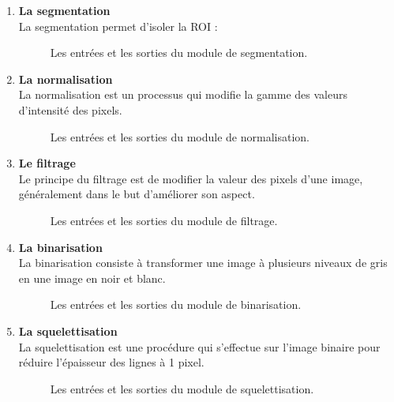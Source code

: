 \begin{enumerate}
	\item \textbf{La segmentation}\\
	La segmentation permet d'isoler la ROI :
	
	\begin{figure}[H]
		\centering
		\caption{Les entrées et les sorties du module de segmentation.}
		\label{segmentModule}
	\end{figure}
	
	
	\item \textbf{La normalisation}\\
	La normalisation est un processus qui modifie la gamme des valeurs d’intensité des pixels.
	
	\begin{figure}[H]
		\centering
		
		\caption{Les entrées et les sorties du module de normalisation.}
		\label{normModule}
	\end{figure}
	
	
	\item\textbf{Le filtrage}\\
	Le principe du filtrage est de modifier la valeur des pixels d'une image, généralement dans le but d'améliorer son aspect. 
	
	\begin{figure}[H]
		\centering
		
		\caption{Les entrées et les sorties du module de filtrage.}
		\label{filterModule}
	\end{figure}
	
	\item\textbf{La binarisation}\\
	La binarisation consiste à transformer une image à plusieurs niveaux de gris en une image en noir et blanc.
	
	\begin{figure}[H]
		\centering
		
		\caption{Les entrées et les sorties du module de binarisation.}
		\label{binModule}
	\end{figure}
	
	\item\textbf{La squelettisation}\\
	La squelettisation est une procédure qui s’effectue sur l’image binaire pour réduire l’épaisseur des lignes à 1 pixel.
	\begin{figure}[H]
		\centering
		\caption{Les entrées et les sorties du module de squelettisation.}
		\label{seqModule}
	\end{figure}
	
\end{enumerate}
